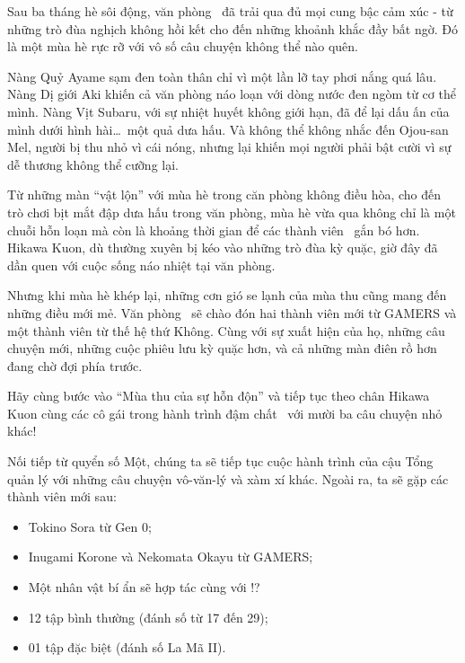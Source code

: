 \documentclass[main.tex]{subfiles}
\begin{document}
Sau ba tháng hè sôi động, văn phòng \hll\ đã trải qua đủ mọi cung bậc cảm xúc - từ những trò đùa nghịch không hồi kết cho đến những khoảnh khắc đầy bất ngờ. Đó là một mùa hè rực rỡ với vô số câu chuyện không thể nào quên.

Nàng Quỷ Ayame sạm đen toàn thân chỉ vì một lần lỡ tay phơi nắng quá lâu. Nàng Dị giới Aki khiến cả văn phòng náo loạn với dòng nước đen ngòm từ cơ thể mình. Nàng Vịt Subaru, với sự nhiệt huyết không giới hạn, đã để lại dấu ấn của mình dưới hình hài\dots\ một quả dưa hấu. Và không thể không nhắc đến Ojou-san Mel, người bị thu nhỏ vì cái nóng, nhưng lại khiến mọi người phải bật cười vì sự dễ thương không thể cưỡng lại.

Từ những màn ``vật lộn'' với mùa hè trong căn phòng không điều hòa, cho đến trò chơi bịt mắt đập dưa hấu trong văn phòng, mùa hè vừa qua không chỉ là một chuỗi hỗn loạn mà còn là khoảng thời gian để các thành viên \hll\ gắn bó hơn. Hikawa Kuon, dù thường xuyên bị kéo vào những trò đùa kỳ quặc, giờ đây đã dần quen với cuộc sống náo nhiệt tại văn phòng.

Nhưng khi mùa hè khép lại, những cơn gió se lạnh của mùa thu cũng mang đến những điều mới mẻ. Văn phòng \hll\ sẽ chào đón hai thành viên mới từ GAMERS và một thành viên từ thế hệ thứ Không. Cùng với sự xuất hiện của họ, những câu chuyện mới, những cuộc phiêu lưu kỳ quặc hơn, và cả những màn điên rồ hơn đang chờ đợi phía trước.

Hãy cùng bước vào ``Mùa thu của sự hỗn độn'' và tiếp tục theo chân Hikawa Kuon cùng các cô gái trong hành trình đậm chất \hll\ với mười ba câu chuyện nhỏ khác!


Nối tiếp từ quyển số Một, chúng ta sẽ tiếp tục cuộc hành trình của cậu Tổng quản lý với những câu chuyện vô-văn-lý và xàm xí khác. Ngoài ra, ta sẽ gặp các thành viên mới sau:

\begin{itemize}
    \item Tokino Sora từ Gen 0;
    \item Inugami Korone và Nekomata Okayu từ GAMERS;
    \item Một nhân vật bí ẩn sẽ hợp tác cùng với \hll!?
\end{itemize}

{}
\begin{itemize}
    \item 12 tập bình thường (đánh số từ 17 đến 29);
    \item 01 tập đặc biệt (đánh số La Mã II).
\end{itemize}
\end{document}

